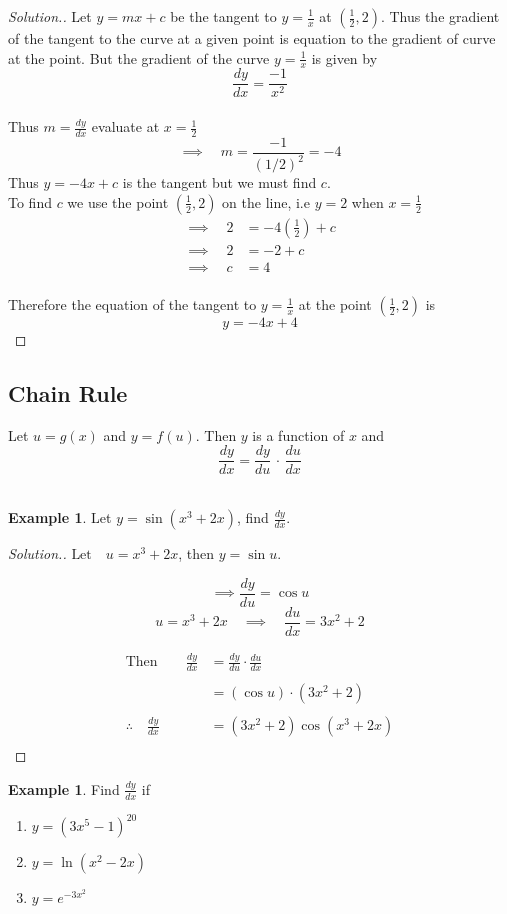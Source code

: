 \documentclass[11pt,a4paper]{article}
\theoremstyle{definition}
\newtheorem{example}[thm]{Example}
\newenvironment{solution}
  {\renewcommand{\qedsymbol}{}\begin{proof}[\textit{Solution}.]}
  {\end{proof}}
\begin{document}
\begin{solution}

Let $y=mx+c$ be the tangent to $y=\frac{1}{x}$ at $\left(\frac{1}{2},2\right)$. Thus the gradient of the tangent to the curve at a  given point is equation to the gradient of curve at the point. But the gradient of the curve $y=\frac{1}{x}$ is given by $$\frac{dy}{dx}=\frac{-1}{x^2}$$\\
Thus $m=\frac{dy}{dx}$ evaluate at $x=\frac{1}{2}$ $$\implies \quad  m=\frac{-1}{(1/2)^2}=-4$$
Thus $y=-4x+c$ is the tangent but we must find $c$.\\
To find $c$ we use the point $\left(\frac{1}{2},2\right)$ on the line, i.e $y=2$ when $x=\frac{1}{2}$  
\begin{align*}
\implies \quad  2& = -4\left(\frac{1}{2}\right)+c\\
\implies \quad  2&=-2 +c\\
\implies \quad  c&=4\\
\end{align*}

Therefore the equation of the tangent to $y=\frac{1}{x}$ at the point $\left(\frac{1}{2},2\right)$ is $$y=-4x+4$$
\end{solution}
\subsection{Chain Rule}
Let $u=g(x)$ and $y=f(u)$. Then $y$ is a function of $x$ and $$\frac{dy}{dx}=\frac{dy}{du}\,\cdot \, \frac{du}{dx}$$\\

\begin{example}

Let $y=\sin (x^3+2x)$, find $\frac{dy}{dx}$.
\end{example}
\pagebreak
\begin{solution}

$\text{Let}\quad  u=x^3+2x$, then $y = \sin u$.


$$\implies \frac{dy}{du}=\cos u$$
$$u=x^3+2x\quad  \implies \quad  \frac{du}{dx}=3x^2+2$$

\begin{align*}
\text{Then}\qquad  \frac{dy}{dx} & =\frac{dy}{du}\cdot \frac{du}{dx}\\\\
&  = (\cos u)\cdot (3x^2+2)\\\\
\therefore \quad  \frac{dy}{dx} & = (3x^2+2)\cos (x^3+2x)\\
\end{align*}
\end{solution}
\begin{example}

Find $\frac{dy}{dx}$ if
\begin{enumerate}
\item $y=(3x^5-1)^{20}$\\
\item $y=\ln (x^2-2x)$\\
\item $y=e^{-3x^2}$
\end{enumerate}
\end{example}
\end{document}
